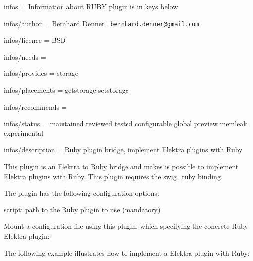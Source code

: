 
\begin{DoxyItemize}
\item infos = Information about R\+U\+BY plugin is in keys below
\item infos/author = Bernhard Denner \href{mailto:bernhard.denner@gmail.com}{\texttt{ bernhard.\+denner@gmail.\+com}}
\item infos/licence = B\+SD
\item infos/needs =
\item infos/provides = storage
\item infos/placements = getstorage setstorage
\item infos/recommends =
\item infos/status = maintained reviewed tested configurable global preview memleak experimental
\item infos/description = Ruby plugin bridge, implement Elektra plugins with Ruby
\end{DoxyItemize}

This plugin is an Elektra to Ruby bridge and makes is possible to implement Elektra plugins with Ruby. This plugin requires the {\ttfamily swig\+\_\+ruby} binding.

The plugin has the following configuration options\+:


\begin{DoxyItemize}
\item {\ttfamily script}\+: path to the Ruby plugin to use (mandatory)
\end{DoxyItemize}

Mount a configuration file using this plugin, which specifying the concrete Ruby Elektra plugin\+:


\begin{DoxyCode}{0}
\end{DoxyCode}


The following example illustrates how to implement a Elektra plugin with Ruby\+:


